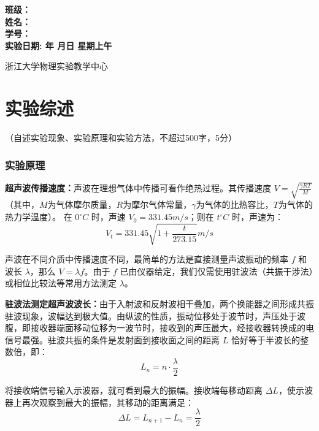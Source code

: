 \documentclass[10pt,a4paper]{ctexart}
\newcommand{\myspace}[1]{\par\vspace{#1\baselineskip}} %
\newcommand{\sihao}{\fontsize{14pt}{18pt}\selectfont}
\newcommand{\xiaosi}{\fontsize{12pt}{16pt}\selectfont}
\begin{document}
\begin{center}
    \myspace{7}
    
   \sihao\textbf{班级：\underline{}} \\[10pt]
    \sihao\textbf{姓名：\underline{}} \\[10pt]
    \sihao\textbf{学号：\underline{}} \\[30pt]
    
    \sihao\textbf{实验日期: \underline{}年 \underline{}月\underline{}日  星期\underline{}上午}
    
    \vspace{18pt}
    \sihao 浙江大学物理实验教学中心
    
\end{center}

\newpage


    \section{实验综述}
    
    \xiaosi （自述实验现象、实验原理和实验方法，不超过500字，5分）
    
    \subsubsection*{实验原理}

    \textbf{超声波传播速度：}声波在理想气体中传播可看作绝热过程。其传播速度 $V = \sqrt{\frac{\gamma RT}{M}}$ （其中，$M$为气体摩尔质量，$R$为摩尔气体常量，$\gamma$为气体的比热容比，$T$为气体的热力学温度）。 在 $0^{\circ}C$ 时，声速 $V_0 = 331.45 m/s$；则在 $t^{\circ}C$ 时，声速为：$$V_t = 331.45 \sqrt{1 + \frac{t}{273.15}} m/s$$
    
    声波在不同介质中传播速度不同，最简单的方法是直接测量声波振动的频率 $f$ 和波长 $\lambda$，那么 $V = \lambda f$。由于 $f$ 已由仪器给定，我们仅需使用驻波法（共振干涉法）或相位比较法等常用方法测定 $\lambda$。 
    
    \textbf{驻波法测定超声波波长：}由于入射波和反射波相干叠加，两个换能器之间形成共振驻波现象，波幅达到极大值。由纵波的性质，振动位移处于波节时，声压处于波腹，即接收器端面移动位移为一波节时，接收到的声压最大，经接收器转换成的电信号最强。驻波共振的条件是发射面到接收面之间的距离 $L$ 恰好等于半波长的整数倍，即：$$L_n = n \cdot \frac{\lambda}{2}$$
    
    将接收端信号输入示波器，就可看到最大的振幅。接收端每移动距离 $\Delta L$，使示波器上再次观察到最大的振幅，其移动的距离满足：$$\Delta L = L_{n+1} - L_{n} = \frac{\lambda}{2}$$
    
\end{document}
